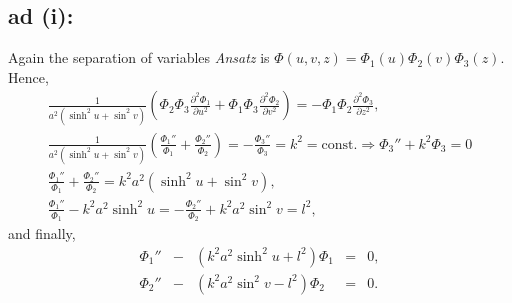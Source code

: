 {\subsection*{ad (i):}
Again the separation of variables {\it Ansatz} is $\Phi(u,v,z)=\Phi_1(u)\Phi_2(v)\Phi_3(z)$.
Hence,
\begin{equation}
\begin{split}
  \frac{1}{a^2(\sinh^2u+\sin^2v)}
  \left(
    \Phi_2\Phi_3\frac{\partial^2\Phi_1}{\partial u^2}+
    \Phi_1\Phi_3\frac{\partial^2\Phi_2}{\partial v^2}
  \right)
  =-\Phi_1\Phi_2\frac{\partial^2\Phi_3}{\partial z^2},
\\
  \frac{1}{a^2(\sinh^2u+\sin^2v)}
  \left(
    \frac{\Phi_1''}{\Phi_1}+
    \frac{\Phi_2''}{\Phi_2}
  \right)=
  -\frac{\Phi_3''}{\Phi_3}=k^2=\mbox{const.}
  \Longrightarrow \Phi_3''+k^2\Phi_3=0
\\
  \frac{\Phi_1''}{\Phi_1}+
  \frac{\Phi_2''}{\Phi_2}=k^2a^2(\sinh^2u+\sin^2v),
\\
  \frac{\Phi_1''}{\Phi_1}-k^2a^2\sinh^2u=
  -\frac{\Phi_2''}{\Phi_2}+k^2a^2\sin^2v=l^2,
\end{split}
\end{equation}
and finally,
$$
  \begin{array}{rcccl}
    \Phi_1'' & - & (k^2a^2\sinh^2u+l^2)\Phi_1 & = & 0, \\
    \Phi_2'' & - & (k^2a^2\sin^2v-l^2)\Phi_2 & = & 0.
  \end{array}
$$


}
